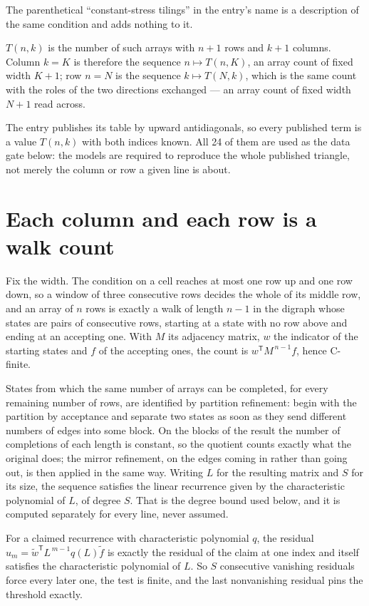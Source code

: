 \documentclass[11pt]{article}
\theoremstyle{definition}
\begin{document}
The parenthetical ``constant-stress tilings'' in the entry's name is a description of the same condition and adds nothing to it.

$T(n,k)$ is the number of such arrays with $n + 1$ rows and $k + 1$ columns. Column $k = K$ is therefore the sequence $n \mapsto T(n,K)$, an array count of fixed width $K + 1$; row $n = N$ is the sequence $k \mapsto T(N,k)$, which is the same count with the roles of the two directions exchanged --- an array count of fixed width $N + 1$ read across.

The entry publishes its table by upward antidiagonals, so every published term is a value $T(n,k)$ with both indices known. All 24 of them are used as the data gate below: the models are required to reproduce the whole published triangle, not merely the column or row a given line is about.

\section{Each column and each row is a walk count}

Fix the width. The condition on a cell reaches at most one row up and one row down, so a window of three consecutive rows decides the whole of its middle row, and an array of $n$ rows is exactly a walk of length $n-1$ in the digraph whose states are pairs of consecutive rows, starting at a state with no row above and ending at an accepting one. With $M$ its adjacency matrix, $w$ the indicator of the starting states and $f$ of the accepting ones, the count is $w^{\mathsf T}M^{\,n-1}f$, hence C-finite.

States from which the same number of arrays can be completed, for every remaining number of rows, are identified by partition refinement: begin with the partition by acceptance and separate two states as soon as they send different numbers of edges into some block. On the blocks of the result the number of completions of each length is constant, so the quotient counts exactly what the original does; the mirror refinement, on the edges coming in rather than going out, is then applied in the same way. Writing $L$ for the resulting matrix and $S$ for its size, the sequence satisfies the linear recurrence given by the characteristic polynomial of $L$, of degree $S$. That is the degree bound used below, and it is computed separately for every line, never assumed.

For a claimed recurrence with characteristic polynomial $q$, the residual $u_m = \tilde w^{\mathsf T}L^{\,m-1}q(L)\tilde f$ is exactly the residual of the claim at one index and itself satisfies the characteristic polynomial of $L$. So $S$ consecutive vanishing residuals force every later one, the test is finite, and the last nonvanishing residual pins the threshold exactly.
\end{document}
